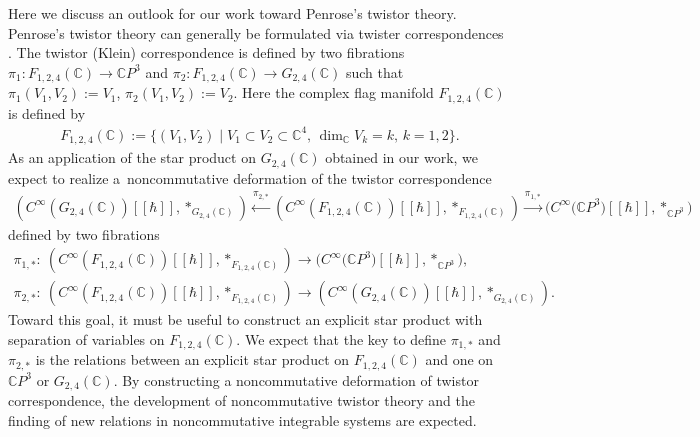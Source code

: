 \documentclass[pdftex]{sigma}
\numberwithin{equation}{section}
\begin{document}
Here we discuss an outlook for our work toward Penrose's twistor theory.
Penrose's twistor theory can generally be formulated via twister correspondences \cite{Pen1,Pen2,Pen3,Ward1,WaWe}.
The twistor (Klein) correspondence  is defined by two fibrations
$
\pi_{1}
\colon
F_{1,2,4}(\mathbb{C})\allowbreak
\to
\mathbb{C}P^{3}
$
and
$
\pi_{2}
\colon
F_{1,2,4}(\mathbb{C})
\to
G_{2,4}(\mathbb{C})
$
such that $\pi_{1}(V_{1},V_{2}):=V_{1}$, $\pi_{2}(V_{1},V_{2}):=V_{2}$. Here the complex flag manifold $F_{1,2,4}(\mathbb{C})$ is defined by
\begin{align*}
F_{1,2,4}(\mathbb{C})
:=
\bigl\{
(V_{1},V_{2})
\mid
V_{1}
\subset
V_{2}
\subset
\mathbb{C}^{4},\,
\dim\nolimits_{\mathbb{C}}
V_{k}
=
k,\,
k=1,2
\bigr\}.
\end{align*}
As an application of the star product on $G_{2,4}(\mathbb{C})$ obtained in our work, we expect to realize a~noncommutative deformation of the twistor correspondence
\begin{align*}
(C^{\infty}(G_{2,4}(\mathbb{C}))[\![\hbar]\!],\ast_{G_{2,4}(\mathbb{C})})
\xleftarrow{\pi_{2,\ast}}
(C^{\infty}(F_{1,2,4}(\mathbb{C}))[\![\hbar]\!],\ast_{F_{1,2,4}(\mathbb{C})})
\xrightarrow{\pi_{1,\ast}}
\bigl(C^{\infty}\bigl(\mathbb{C}P^{3}\bigr)[\![\hbar]\!],\ast_{\mathbb{C}P^{3}}\bigr)
\end{align*}
defined by two fibrations
\begin{gather*}
\pi_{1,\ast}\colon\
(C^{\infty}(F_{1,2,4}(\mathbb{C}))[\![\hbar]\!],\ast_{F_{1,2,4}(\mathbb{C})})
\to
\bigl(C^{\infty}\bigl(\mathbb{C}P^{3}\bigr)[\![\hbar]\!],\ast_{\mathbb{C}P^{3}}\bigr),
\\
\pi_{2,\ast}\colon\
(C^{\infty}(F_{1,2,4}(\mathbb{C}))[\![\hbar]\!],\ast_{F_{1,2,4}(\mathbb{C})})
\to
(C^{\infty}(G_{2,4}(\mathbb{C}))[\![\hbar]\!],\ast_{G_{2,4}(\mathbb{C})}).
\end{gather*}
Toward this goal, it must be useful to construct an explicit star product with separation of variables on $F_{1,2,4}(\mathbb{C})$.
We expect that the key to define $\pi_{1,\ast}$ and $\pi_{2,\ast}$ is the relations between an explicit star product on $F_{1,2,4}(\mathbb{C})$ and one on $\mathbb{C}P^{3}$ or $G_{2,4}(\mathbb{C})$.
By constructing a noncommutative deformation of twistor correspondence, the development of noncommutative twistor theory and the finding of new relations in noncommutative integrable systems are expected.

\appendix
\end{document}
